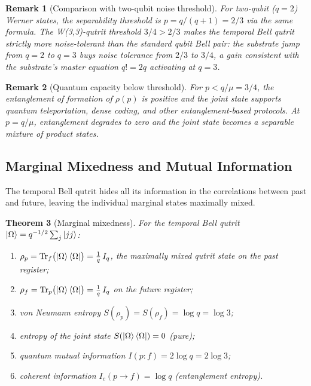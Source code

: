 ﻿\documentclass[12pt]{article}
\newtheorem{theorem}{Theorem}[section]
\newtheorem{remark}[theorem]{Remark}
\begin{document}
\begin{remark}[Comparison with two-qubit noise threshold]\label{rem:qubit_compare}
For two-qubit ($q=2$) Werner states, the separability threshold is
$p = q/(q+1) = 2/3$ via the same formula.  The W(3,3)-qutrit threshold
$3/4 > 2/3$ makes the temporal Bell qutrit \emph{strictly more
noise-tolerant} than the standard qubit Bell pair: the substrate jump from
$q=2$ to $q=3$ buys noise tolerance from $2/3$ to $3/4$, a gain consistent
with the substrate's master equation $q! = 2q$ activating at $q=3$.
\end{remark}

\begin{remark}[Quantum capacity below threshold]\label{rem:capacity}
For $p < q/\mu = 3/4$, the entanglement of formation of $\rho(p)$ is positive
and the joint state supports quantum teleportation, dense coding, and other
entanglement-based protocols.  At $p = q/\mu$, entanglement degrades to zero
and the joint state becomes a separable mixture of product states.
\end{remark}

\subsection{Marginal Mixedness and Mutual Information}
\label{sec:marginal}

The temporal Bell qutrit hides all its information in the correlations between
past and future, leaving the individual marginal states maximally mixed.

\begin{theorem}[Marginal mixedness]\label{thm:marginal}
For the temporal Bell qutrit $\ket{\Omega} = q^{-1/2}\sum_j\ket{jj}$:
\begin{enumerate}[label=(\roman*),noitemsep]
  \item $\rho_p = \mathrm{Tr}_f\bigl(\ket{\Omega}\bra{\Omega}\bigr)
    = \frac{1}{q}\,I_q$, the maximally mixed qutrit state on the past register;
  \item $\rho_f = \mathrm{Tr}_p\bigl(\ket{\Omega}\bra{\Omega}\bigr) = \frac{1}{q}\,I_q$
    on the future register;
  \item von Neumann entropy $S(\rho_p) = S(\rho_f) = \log q = \log 3$;
  \item entropy of the joint state $S(\ket{\Omega}\bra{\Omega}) = 0$ (pure);
  \item quantum mutual information $I(p:f) = 2 \log q = 2 \log 3$;
  \item coherent information $I_c(p \rightarrow f) = \log q$ (entanglement
    entropy).
\end{enumerate}
\end{theorem}
\end{document}
